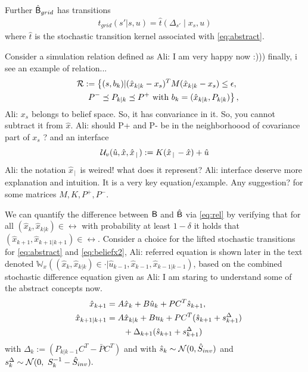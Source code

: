 \documentclass{ifacconf}
\newcommand{\red}[1]{{\color{red} #1}}
\renewcommand{\axx}[1]{{\color{orange} Ali: #1}}
\begin{document}
Further $\hat{\mathsf{B}}_{grid}$  has transitions 
\begin{align}\label{eq:tgrid}
t_{grid}(s'|s,u)=\hat t \left(\Delta_{s'}\mid x_s, u\right)
\end{align}where $\hat t$ is the stochastic transition kernel associated with \eqref{eq:abstract}.


Consider a simulation relation defined as 
\axx{I am very happy now :))) finally, i see an example of relation...}
	\begin{align}\label{eq:rel}
\mathcal{R} := \left\{(s,b_k)| (\hat x_{k|k}-x_s)^T M(\hat x_{k|k}-x_s)\leq \epsilon, \right.\\\qquad\left.  P^-\preceq P_{k|k} \preceq   P^+ \mbox{ with } b_k=(\hat x_{k|k}, P_{k|k} ) \right\},\notag
	\end{align}
\axx{$x_s$ belongs to belief space. So, it has convariance in it. So, you cannot subtract it from $\hat{x}$.}
\axx{should P+ and P- be in the neighborhoood of covariance part of $x_s$ ?}
and an interface 
\[\mathcal{U}_{v}(\hat u, \hat x, \hat x_{\,|\,}):=K( \hat x_{\,|\,} -\hat x)+\hat u\]
\axx{the notation $\hat x_{\,|\,}$ is weired! what does it represent?}
\axx{interface deserve more explanation and intuition. It is a very key equation/example.}\red{Any suggestion?}
for some matrices $M, K,P^+,P^-$.



We can quantify the difference between $\mathsf{B}$ and $\hat{\mathsf{B}}$ via \eqref{eq:rel} by verifying that for all  $(\hat x_k,\hat x_{k|k})\in \rel$ with probability at least $1-\delta$ it holds that $(\hat x_{k+1},\hat x_{k+1|k+1})\in \rel$. 
Consider a choice for the lifted stochastic  transitions  for \eqref{eq:abstract} and \eqref{eq:beliefx2}, \axx{referred equation is shown later in the text} denoted 
	$ \mathbb W_{x}((\hat x_k, \hat x_{k|k})\in \cdot| \hat u_{k-1}, \hat x_{k-1}, \hat x_{k-1|k-1})$, based on the combined stochastic difference equation given as
\axx{I am staring to understand some of the abstract concepts now.}
\begin{align*}
		&&\hat x_{k+1} &=A\hat x_{k} +B\hat u_{k} + \bar P  C^T  \hat{s}_{k+1},\\%
	&&\hat x_{k+1|k+1}&=A\hat x_{k|k}+Bu_{k}+  \bar P   C^T(  \hat{s}_{k+1}+s^\Delta_{k+1})\notag\\&&&\qquad+\Delta_{k+1}( \hat{s}_{k+1}+ s^\Delta_{k+1})%
\end{align*}
 with $\Delta_k:=(P_{k|k-1}C^T-  \bar P   C^T)$ and with $ \hat{s}_k\sim \mathcal{N} (0,\hat{S}_{inv})$ and $ s^\Delta_k\sim  \mathcal{N} (0,\  S_k^{-1}-\hat{S}_{inv}). $
\end{document}
